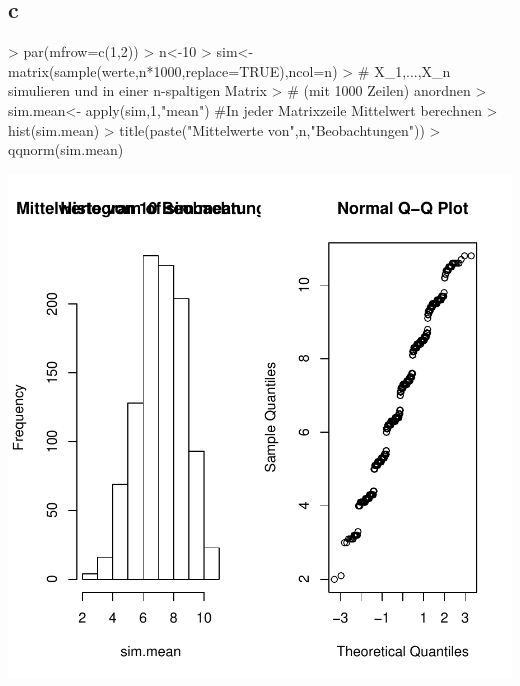 \subsection{c}
\begin{Schunk}
\begin{Sinput}
> par(mfrow=c(1,2))
> n<-10
> sim<-matrix(sample(werte,n*1000,replace=TRUE),ncol=n)
> # X_1,...,X_n simulieren und in einer n-spaltigen Matrix
> # (mit 1000 Zeilen) anordnen
> sim.mean<- apply(sim,1,"mean") #In jeder Matrixzeile Mittelwert berechnen
> hist(sim.mean)
> title(paste("Mittelwerte von",n,"Beobachtungen"))
> qqnorm(sim.mean)
\end{Sinput}
\end{Schunk}
\includegraphics{sw08_4-003}

